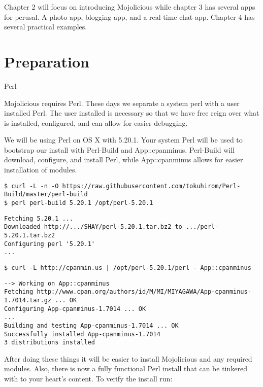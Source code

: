 \documentclass[14pt]{extreport}
\begin{document}
Chapter 2 will focus on introducing Mojolicious while chapter 3 has several
apps for perusal.  A photo app, blogging app, and a real-time chat app.
Chapter 4 has several practical examples.

\chapter*{Preparation}

{\Large Perl}

Mojolicious requires Perl.  These days we separate a system perl with a user
installed Perl.  The user installed is necessary so that we have free reign
over what is installed, configured, and can allow for easier debugging.

We will be using Perl on OS X with 5.20.1.  Your system Perl will be used to
bootstrap our install with Perl-Build and App::cpanminus.  Perl-Build will
download, configure, and install Perl, while App::cpanminus allows for easier
installation of modules.

\begin{lstlisting}[style=BashInputStyle]
$ curl -L -n -O https://raw.githubusercontent.com/tokuhirom/Perl-Build/master/perl-build
$ perl perl-build 5.20.1 /opt/perl-5.20.1
\end{lstlisting}

\begin{lstlisting}[style=BashOutputStyle]
Fetching 5.20.1 ...
Downloaded http://.../SHAY/perl-5.20.1.tar.bz2 to .../perl-5.20.1.tar.bz2
Configuring perl '5.20.1'
...
\end{lstlisting}

\begin{lstlisting}[style=BashInputStyle, keepspaces=true]
$ curl -L http://cpanmin.us | /opt/perl-5.20.1/perl - App::cpanminus
\end{lstlisting}

\begin{lstlisting}[style=BashOutputStyle]
--> Working on App::cpanminus
Fetching http://www.cpan.org/authors/id/M/MI/MIYAGAWA/App-cpanminus-1.7014.tar.gz ... OK
Configuring App-cpanminus-1.7014 ... OK
...
Building and testing App-cpanminus-1.7014 ... OK
Successfully installed App-cpanminus-1.7014
3 distributions installed
\end{lstlisting}

After doing these things it will be easier to install Mojolicious and any
required modules.  Also, there is now a fully functional Perl install that can
be tinkered with to your heart's content.  To verify the install run:
\end{document}
